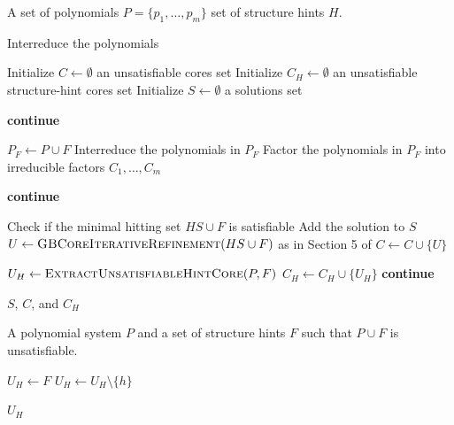 \documentclass[12pt]{article}
\begin{document}
\begin{algorithm}
\caption{Outer branching}
\label{alg:Outer branching}
\begin{algorithmic}[1]
    \Require A set of polynomials $P = \{p_1, \ldots, p_m\}$ set of structure hints $H$.

    \State Interreduce the polynomials

    \State Initialize $C \gets \emptyset$ an unsatisfiable cores set
    \State Initialize $C_H \gets \emptyset$ an unsatisfiable structure-hint cores set
    \State Initialize $S \gets \emptyset$ a solutions set

            \State \textbf{continue}
        \EndIf

        \State $P_F \gets P \cup F$
        \State Interreduce the polynomials in $P_F$
        \State Factor the polynomials in $P_F$ into irreducible factors $C_1, \ldots, C_m$

                \State \textbf{continue}
            \EndIf

            \State Check if the minimal hitting set $HS \cup F$ is satisfiable
                \State Add the solution to $S$
            \Else
                \State $U \gets \Call{GBCoreIterativeRefinement}{HS \cup F}$ as in Section 5 of \cite{sun2016}
                \State $C \gets C \cup \{U\}$
            \EndIf
        \EndFor

            \State $U_H \gets \Call{ExtractUnsatisfiableHintCore}{P, F}$
            \State $C_H \gets C_H \cup \{U_H\}$
            \State \textbf{continue}
        \EndIf
    \EndFor

    \Return $S$, $C$, and $C_H$

\end{algorithmic}
\end{algorithm}

\begin{algorithm}
\caption{Extracting a minimal unsatisfiable structure-hint core}
\label{alg:extracting a minimal unsatisfiable structure-hint core}
\begin{algorithmic}[1]
    \Require A polynomial system $P$ and a set of structure hints $F$ such that $P \cup F$ is unsatisfiable.

    \State $U_H \gets F$
            \State $U_H \gets U_H \setminus \{h\}$
        \EndIf
    \EndFor

    \Return $U_H$

\end{algorithmic}
\end{algorithm}
\end{document}
